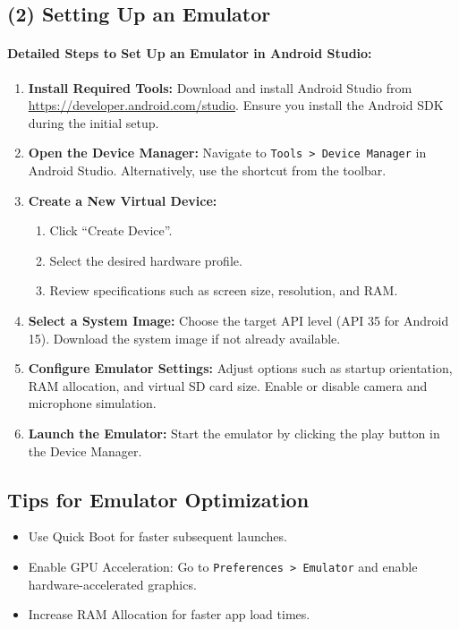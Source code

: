 \documentclass[12pt]{article}
\begin{document}
\subsection*{(2) Setting Up an Emulator}

\paragraph{Detailed Steps to Set Up an Emulator in Android Studio:}
\begin{enumerate}
    \item \textbf{Install Required Tools:} Download and install Android Studio from \url{https://developer.android.com/studio}. Ensure you install the Android SDK during the initial setup.
    \item \textbf{Open the Device Manager:} Navigate to \texttt{Tools > Device Manager} in Android Studio. Alternatively, use the shortcut from the toolbar.
    \item \textbf{Create a New Virtual Device:}
    \begin{enumerate}[label*=\arabic*.]
        \item Click ``Create Device''.
        \item Select the desired hardware profile.
        \item Review specifications such as screen size, resolution, and RAM.
    \end{enumerate}
    \item \textbf{Select a System Image:} Choose the target API level (API 35 for Android 15). Download the system image if not already available.
    \item \textbf{Configure Emulator Settings:} Adjust options such as startup orientation, RAM allocation, and virtual SD card size. Enable or disable camera and microphone simulation.
    \item \textbf{Launch the Emulator:} Start the emulator by clicking the play button in the Device Manager.
\end{enumerate}

\subsection*{Tips for Emulator Optimization}
\begin{itemize}
    \item Use Quick Boot for faster subsequent launches.
    \item Enable GPU Acceleration: Go to \texttt{Preferences > Emulator} and enable hardware-accelerated graphics.
    \item Increase RAM Allocation for faster app load times.
\end{itemize}
\end{document}
